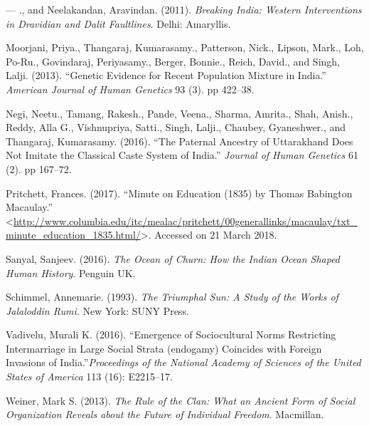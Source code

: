 \begin{thebibliography}{99}
  --- ., and Neelakandan, Aravindan. (2011). \textit{Breaking India: Western Interventions in Dravidian and Dalit Faultlines}. Delhi: Amaryllis.

  Moorjani, Priya., Thangaraj, Kumarasamy., Patterson, Nick., Lipson, Mark., Loh, Po-Ru., Govindaraj, Periyasamy., Berger, Bonnie., Reich, David., and Singh, Lalji. (2013). “Genetic Evidence for Recent Population Mixture in India.” \textit{American Journal of Human Genetics} 93 (3). pp 422–38.

  Negi, Neetu., Tamang, Rakesh., Pande, Veena., Sharma, Amrita., Shah, Anish., Reddy, Alla G., Vishnupriya, Satti., Singh, Lalji., Chaubey, Gyaneshwer., and Thangaraj, Kumarasamy. (2016). “The Paternal Ancestry of Uttarakhand Does Not Imitate the Classical Caste System of India.” \textit{Journal of Human Genetics} 61 (2). pp 167–72.

  Pritchett, Frances. (2017). “Minute on Education (1835) by Thomas Babington Macaulay.” \textless \url{http://www.columbia.edu/itc/mealac/pritchett/00generallinks/macaulay/txt_minute_education_1835.html/}\textgreater. Accessed on 21 March 2018.

  Sanyal, Sanjeev. (2016). \textit{The Ocean of Churn: How the Indian Ocean Shaped Human History}. Penguin UK.

  Schimmel, Annemarie. (1993). \textit{The Triumphal Sun: A Study of the Works of Jalaloddin Rumi}. New York: SUNY Press.

  Vadivelu, Murali K. (2016). “Emergence of Sociocultural Norms Restricting Intermarriage in Large Social Strata (endogamy) Coincides with Foreign Invasions of India.”\textit{Proceedings of the National Academy of Sciences of the United States of America} 113 (16): E2215–17.

  Weiner, Mark S. (2013). \textit{The Rule of the Clan: What an Ancient Form of Social Organization Reveals about the Future of Individual Freedom}. Macmillan.

 \end{thebibliography}

\theendnotes

